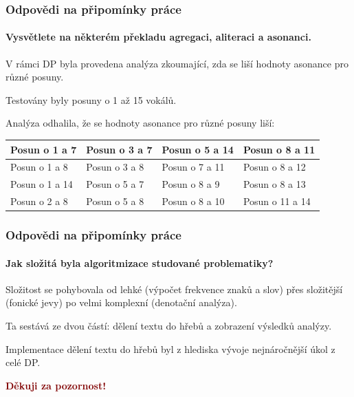 \documentclass[12pt,xcolor=usenames,dvipsnames]{beamer}
\begin{document}
\begin{frame}[fragile]
	\frametitle{Odpovědi na připomínky práce}
	\framesubtitle{Vysvětlete na některém překladu agregaci, aliteraci a \textbf{asonanci}.}

	V rámci DP byla provedena analýza zkoumající, zda se liší hodnoty asonance pro různé posuny. 
	
	Testovány byly posuny o 1 až 15 vokálů. 
	
	Analýza odhalila, že se hodnoty asonance pro různé posuny liší:

	{\small \begin{tabular}{|l|l|l|l|}
		\hline Posun o 1 a 7  & Posun o 3 a 7 & Posun o 5 a 14 & Posun o 8 a 11  \\ 
		\hline Posun o 1 a 8  & Posun o 3 a 8 & Posun o 7 a 11 & Posun o 8 a 12  \\ 
		\hline Posun o 1 a 14 & Posun o 5 a 7 & Posun o 8 a 9  & Posun o 8 a 13  \\ 
		\hline Posun o 2 a 8  & Posun o 5 a 8 & Posun o 8 a 10 & Posun o 11 a 14 \\ 
		\hline 
	\end{tabular} }


\end{frame}

\begin{frame}
	\frametitle{Odpovědi na připomínky práce}
	\framesubtitle{Jak složitá byla algoritmizace studované problematiky?}

	Složitost se pohybovala od lehké (výpočet frekvence znaků a slov) přes složitější (fonické jevy) po velmi komplexní (denotační analýza).

	Ta sestává ze dvou částí: dělení textu do hřebů a zobrazení výsledků analýzy.

	Implementace dělení textu do hřebů byl z hlediska vývoje nejnáročnější úkol  z celé DP.

\end{frame}

\begin{frame}
\begin{block}{}
\begin{center}
\textcolor{Maroon}{\textbf{{\huge Děkuji za pozornost!}}}
\end{center}
\end{block}
\end{frame}
\end{document}
